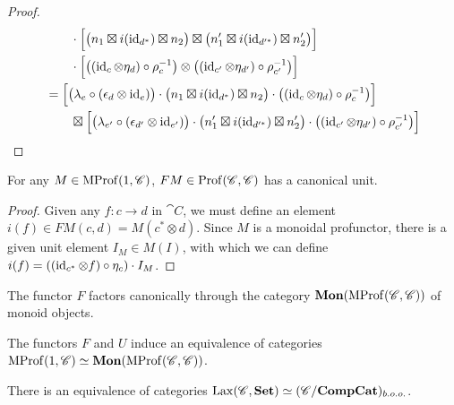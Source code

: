 \documentclass[12pt,oneside,article,draft]{memoir}
\begin{document}
\begin{proof}
\begin{align*}
		&\qquad \cdot\Bigl[\bigl(n_1\boxtimes i(\operatorname{id}_{d^*})\boxtimes n_2\bigr)\boxtimes\bigl(n'_1\boxtimes i(\operatorname{id}_{d'^*})\boxtimes n'_2\bigr)\Bigr] \\
		&\qquad \cdot\Bigl[\bigl((\operatorname{id}_c\otimes\eta_d)\circ\rho_c^{-1}\bigr)\otimes\bigl((\operatorname{id}_{c'}\otimes\eta_{d'})\circ\rho_{c'}^{-1}\bigr)\Bigr] \\
		&= \Bigl[\bigl(\lambda_e\circ(\epsilon_d\otimes\operatorname{id}_e)\bigr)\cdot\bigl(n_1\boxtimes i(\operatorname{id}_{d^*})\boxtimes n_2\bigr)\cdot\bigl((\operatorname{id}_c\otimes\eta_d)\circ\rho_c^{-1}\bigr)\Bigr] \\
		&\qquad \boxtimes\Bigl[\bigl(\lambda_{e'}\circ(\epsilon_{d'}\otimes\operatorname{id}_{e'})\bigr)\cdot\bigl(n'_1\boxtimes i(\operatorname{id}_{d'^*})\boxtimes n'_2\bigr)\cdot\bigl((\operatorname{id}_{c'}\otimes\eta_{d'})\circ\rho_{c'}^{-1}\bigr)\Bigr]
	\end{align*}
\end{proof}

\begin{proposition}
	For any $M\in\operatorname{MProf}(1,\mathscr{C})$, $FM\in\operatorname{Prof}(\mathscr{C},\mathscr{C})$ has a canonical unit.
\end{proposition}
\begin{proof}
	Given any $f\colon c\to d$ in $\cat{C}$, we must define an element $i(f)\in FM(c,d)=M(c^*\otimes d)$. Since $M$ is a monoidal profunctor, there is a given unit element $I_M\in M(I)$, with which we can define $i(f)=((\operatorname{id}_{c^*}\otimes f)\circ\eta_c)\cdot I_M$.
\end{proof}

\begin{corollary}
	The functor $F$ factors canonically through the category $\mathbf{Mon}(\operatorname{MProf}(\mathscr{C},\mathscr{C}))$ of monoid objects.
\end{corollary}

\begin{proposition}
	The functors $F$ and $U$ induce an equivalence of categories $\operatorname{MProf}(1,\mathscr{C})\simeq\mathbf{Mon}(\operatorname{MProf}(\mathscr{C},\mathscr{C}))$.
\end{proposition}

\begin{corollary}\label{cor:ccc's lax and strong}
	There is an equivalence of categories $\operatorname{Lax}(\mathscr{C},\mathbf{Set})\simeq(\mathscr{C}/\mathbf{CompCat})_{b.o.o.}$.
\end{corollary}
\end{document}
